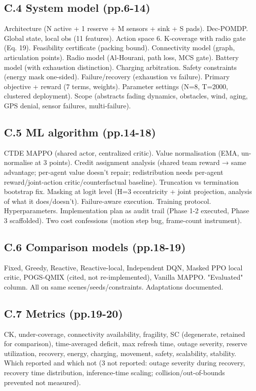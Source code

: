 \documentclass[10pt]{article}
\begin{document}
\subsection{C.4 System model (pp.6-14)}
Architecture (N active + 1 reserve + M sensors + sink + S pads). Dec-POMDP. Global state, local obs (11 features). Action space 6. K-coverage with radio gate (Eq. 19). Feasibility certificate (packing bound). Connectivity model (graph, articulation points). Radio model (Al-Hourani, path loss, MCS gate). Battery model (with exhaustion distinction). Charging arbitration. Safety constraints (energy mask one-sided). Failure/recovery (exhaustion vs failure). Primary objective + reward (7 terms, weights). Parameter settings (N=8, T=2000, clustered deployment). Scope (abstracts fading dynamics, obstacles, wind, aging, GPS denial, sensor failures, multi-failure).

\subsection{C.5 ML algorithm (pp.14-18)}
CTDE MAPPO (shared actor, centralized critic). Value normalisation (EMA, un-normalise at 3 points). Credit assignment analysis (shared team reward → same advantage; per-agent value doesn't repair; redistribution needs per-agent reward/joint-action critic/counterfactual baseline). Truncation vs termination bootstrap fix. Masking at logit level (H=3 eccentricity + joint projection, analysis of what it does/doesn't). Failure-aware execution. Training protocol. Hyperparameters. Implementation plan as audit trail (Phase 1-2 executed, Phase 3 scaffolded). Two cost confessions (motion step bug, frame-count instrument).

\subsection{C.6 Comparison models (pp.18-19)}
Fixed, Greedy, Reactive, Reactive-local, Independent DQN, Masked PPO local critic, POGS-QMIX (cited, not re-implemented), Vanilla MAPPO. "Evaluated" column. All on same scenes/seeds/constraints. Adaptations documented.

\subsection{C.7 Metrics (pp.19-20)}
CK, under-coverage, connectivity availability, fragility, SC (degenerate, retained for comparison), time-averaged deficit, max refresh time, outage severity, reserve utilization, recovery, energy, charging, movement, safety, scalability, stability. Which reported and which not (3 not reported: outage severity during recovery, recovery time distribution, inference-time scaling; collision/out-of-bounds prevented not measured).
\end{document}
